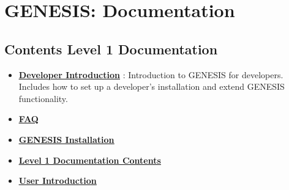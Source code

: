 \documentclass[12pt]{article}
\begin{document}
\section*{GENESIS: Documentation}

\subsection*{Contents Level 1 Documentation}

\begin{itemize}

\item \href{../developer-intro/developer-intro.pdf}{\bf \underline{Developer Introduction}} : Introduction to GENESIS for developers. Includes how to set up a developer's installation and extend GENESIS functionality.

\item \href{../faq/faq.pdf}{\bf \underline{FAQ}}

\item \href{../genesis-installation/genesis-installation.pdf}{\bf \underline{GENESIS Installation}}

\item \href{../contents-level1/contents-level1.pdf}{\bf \underline{Level 1 Documentation Contents}}

\item \href{../user-intro/user-intro.pdf}{\bf \underline{User Introduction}}


\end{itemize}

\end{document}
